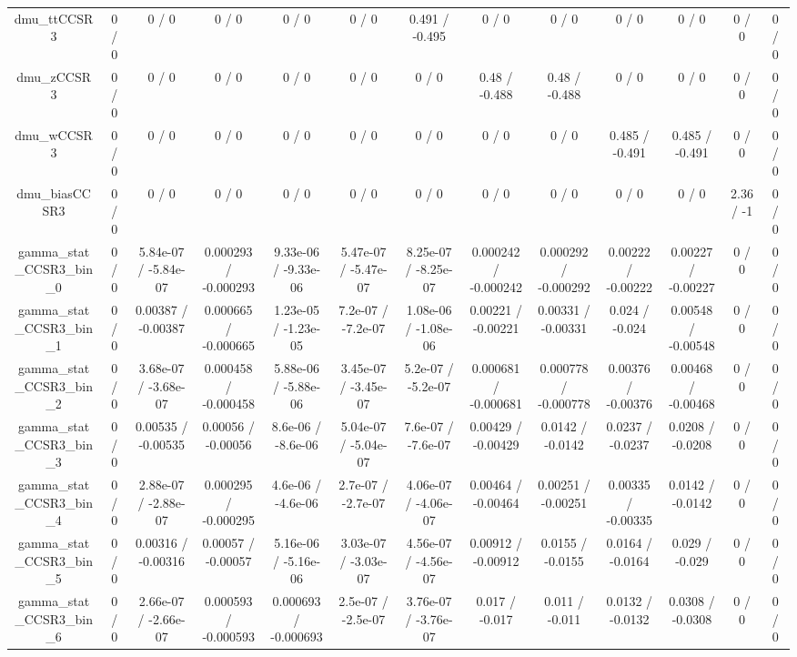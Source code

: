 \documentclass[10pt]{article}
\begin{document}
\begin{table}[htbp]
\begin{center}
\begin{tabular}{|c|c|c|c|c|c|c|c|c|c|c|c|c|}
  dmu_ttCCSR3 & 0 / 0 & 0 / 0 & 0 / 0 & 0 / 0 & 0 / 0 & 0.491 / -0.495 & 0 / 0 & 0 / 0 & 0 / 0 & 0 / 0 & 0 / 0 & 0 / 0 \\ 
  dmu_zCCSR3 & 0 / 0 & 0 / 0 & 0 / 0 & 0 / 0 & 0 / 0 & 0 / 0 & 0.48 / -0.488 & 0.48 / -0.488 & 0 / 0 & 0 / 0 & 0 / 0 & 0 / 0 \\ 
  dmu_wCCSR3 & 0 / 0 & 0 / 0 & 0 / 0 & 0 / 0 & 0 / 0 & 0 / 0 & 0 / 0 & 0 / 0 & 0.485 / -0.491 & 0.485 / -0.491 & 0 / 0 & 0 / 0 \\ 
  dmu_biasCCSR3 & 0 / 0 & 0 / 0 & 0 / 0 & 0 / 0 & 0 / 0 & 0 / 0 & 0 / 0 & 0 / 0 & 0 / 0 & 0 / 0 & 2.36 / -1 & 0 / 0 \\ 
  gamma_stat_CCSR3_bin_0 & 0 / 0 & 5.84e-07 / -5.84e-07 & 0.000293 / -0.000293 & 9.33e-06 / -9.33e-06 & 5.47e-07 / -5.47e-07 & 8.25e-07 / -8.25e-07 & 0.000242 / -0.000242 & 0.000292 / -0.000292 & 0.00222 / -0.00222 & 0.00227 / -0.00227 & 0 / 0 & 0 / 0 \\ 
  gamma_stat_CCSR3_bin_1 & 0 / 0 & 0.00387 / -0.00387 & 0.000665 / -0.000665 & 1.23e-05 / -1.23e-05 & 7.2e-07 / -7.2e-07 & 1.08e-06 / -1.08e-06 & 0.00221 / -0.00221 & 0.00331 / -0.00331 & 0.024 / -0.024 & 0.00548 / -0.00548 & 0 / 0 & 0 / 0 \\ 
  gamma_stat_CCSR3_bin_2 & 0 / 0 & 3.68e-07 / -3.68e-07 & 0.000458 / -0.000458 & 5.88e-06 / -5.88e-06 & 3.45e-07 / -3.45e-07 & 5.2e-07 / -5.2e-07 & 0.000681 / -0.000681 & 0.000778 / -0.000778 & 0.00376 / -0.00376 & 0.00468 / -0.00468 & 0 / 0 & 0 / 0 \\ 
  gamma_stat_CCSR3_bin_3 & 0 / 0 & 0.00535 / -0.00535 & 0.00056 / -0.00056 & 8.6e-06 / -8.6e-06 & 5.04e-07 / -5.04e-07 & 7.6e-07 / -7.6e-07 & 0.00429 / -0.00429 & 0.0142 / -0.0142 & 0.0237 / -0.0237 & 0.0208 / -0.0208 & 0 / 0 & 0 / 0 \\ 
  gamma_stat_CCSR3_bin_4 & 0 / 0 & 2.88e-07 / -2.88e-07 & 0.000295 / -0.000295 & 4.6e-06 / -4.6e-06 & 2.7e-07 / -2.7e-07 & 4.06e-07 / -4.06e-07 & 0.00464 / -0.00464 & 0.00251 / -0.00251 & 0.00335 / -0.00335 & 0.0142 / -0.0142 & 0 / 0 & 0 / 0 \\ 
  gamma_stat_CCSR3_bin_5 & 0 / 0 & 0.00316 / -0.00316 & 0.00057 / -0.00057 & 5.16e-06 / -5.16e-06 & 3.03e-07 / -3.03e-07 & 4.56e-07 / -4.56e-07 & 0.00912 / -0.00912 & 0.0155 / -0.0155 & 0.0164 / -0.0164 & 0.029 / -0.029 & 0 / 0 & 0 / 0 \\ 
  gamma_stat_CCSR3_bin_6 & 0 / 0 & 2.66e-07 / -2.66e-07 & 0.000593 / -0.000593 & 0.000693 / -0.000693 & 2.5e-07 / -2.5e-07 & 3.76e-07 / -3.76e-07 & 0.017 / -0.017 & 0.011 / -0.011 & 0.0132 / -0.0132 & 0.0308 / -0.0308 & 0 / 0 & 0 / 0 \\ 

\end{tabular}
\end{center}
\end{table}
\end{document}
